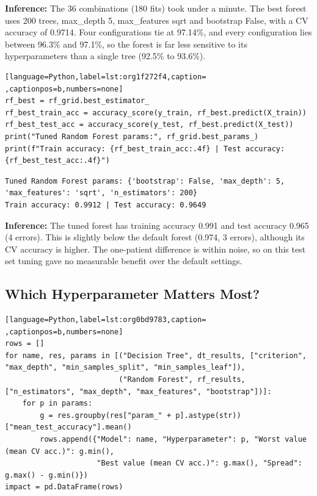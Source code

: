 \documentclass[11pt]{article}
\begin{document}
\textbf{Inference:} The 36 combinations (180 fits) took under a minute. The best forest uses 200 trees,
max\_depth 5, max\_features sqrt and bootstrap False, with a CV accuracy of 0.9714. Four
configurations tie at 97.14\%, and every configuration lies between 96.3\% and 97.1\%, so the
forest is far less sensitive to its hyperparameters than a single tree (92.5\% to 93.6\%).
\begin{lstlisting}[language=Python,label=lst:org1f272f4,caption= ,captionpos=b,numbers=none]
rf_best = rf_grid.best_estimator_
rf_best_train_acc = accuracy_score(y_train, rf_best.predict(X_train))
rf_best_test_acc = accuracy_score(y_test, rf_best.predict(X_test))
print("Tuned Random Forest params:", rf_grid.best_params_)
print(f"Train accuracy: {rf_best_train_acc:.4f} | Test accuracy: {rf_best_test_acc:.4f}")
\end{lstlisting}

\begin{verbatim}
Tuned Random Forest params: {'bootstrap': False, 'max_depth': 5, 'max_features': 'sqrt', 'n_estimators': 200}
Train accuracy: 0.9912 | Test accuracy: 0.9649
\end{verbatim}


\textbf{Inference:} The tuned forest has training accuracy 0.991 and test accuracy 0.965 (4 errors). This is
slightly below the default forest (0.974, 3 errors), although its CV accuracy is higher. The
one-patient difference is within noise, so on this test set tuning gave no measurable
benefit over the default settings.

\subsection*{Which Hyperparameter Matters Most?}
\label{sec:org4e4c8a6}

\begin{lstlisting}[language=Python,label=lst:org0bd9783,caption= ,captionpos=b,numbers=none]
rows = []
for name, res, params in [("Decision Tree", dt_results, ["criterion", "max_depth", "min_samples_split", "min_samples_leaf"]),
                          ("Random Forest", rf_results, ["n_estimators", "max_depth", "max_features", "bootstrap"])]:
    for p in params:
        g = res.groupby(res["param_" + p].astype(str))["mean_test_accuracy"].mean()
        rows.append({"Model": name, "Hyperparameter": p, "Worst value (mean CV acc.)": g.min(),
                     "Best value (mean CV acc.)": g.max(), "Spread": g.max() - g.min()})
impact = pd.DataFrame(rows)
\end{lstlisting}
\end{document}
